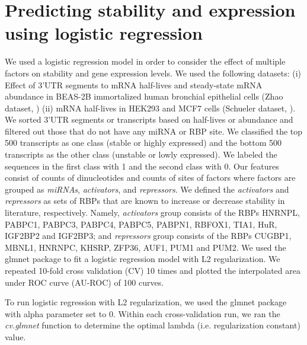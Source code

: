\section{Predicting stability and expression using logistic regression}

We used a logistic regression model in order to consider the effect of multiple factors on stability and gene expression levels. We used the following datasets: (i) Effect of 3'UTR segments to mRNA half-lives and steady-state mRNA abundance in BEAS-2B immortalized human bronchial epithelial cells (Zhao dataset, \cite{zhao_14}) (ii)  mRNA half-lives  in HEK293 and MCF7 cells (Schueler dataset, \cite{schueler_14}). We sorted 3'UTR segments or transcripts based on half-lives or abundance and filtered out those that do not have any miRNA or RBP site. We classified the top 500 transcripts as one class (stable or highly expressed) and the bottom 500 transcripts as the other class (unstable or lowly expressed). We labeled the sequences in the first class with 1 and the second class with 0. Our features consist of counts of dinucleotides and counts of sites of factors where factors are grouped as \textit{miRNAs}, \textit{activators}, and \textit{repressors}. We defined the \textit{activators} and \textit{repressors} as sets of RBPs that are known to increase or decrease stability in literature, respectively. Namely, \textit{activators} group consists of the RBPs  HNRNPL, PABPC1, PABPC3, PABPC4, PABPC5, PABPN1, RBFOX1, TIA1, HuR, IGF2BP2 and IGF2BP3; and \textit{repressors} group consists of the RBPs CUGBP1, MBNL1, HNRNPC, KHSRP, ZFP36, AUF1, PUM1 and PUM2. We used the glmnet package to fit a logistic regression model with L2 regularization. We repeated 10-fold cross validation (CV) 10 times and plotted the interpolated area under ROC curve (AU-ROC) of 100 curves.

To run logistic regression with L2 regularization, we used the glmnet package \cite{glmnet} with alpha parameter set to 0. Within each cross-validation run, we ran the \textit{cv.glmnet} function to determine the optimal lambda (i.e. regularization constant) value. 